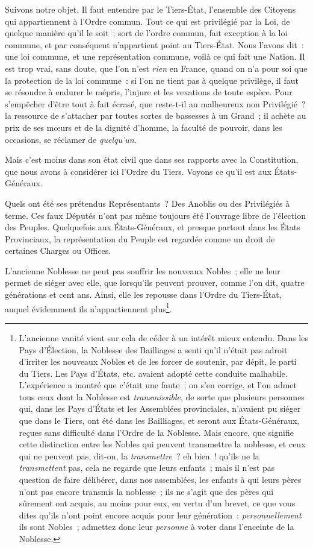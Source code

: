 \documentclass[french,twoside]{book} %
\begin{document}
Suivons notre objet. Il faut entendre par le Tiers-État, l’ensemble des Citoyens qui appartiennent à l’Ordre commun. Tout ce qui est privilégié par la Loi, de quelque manière qu’il le soit ; sort de l’ordre commun, fait exception à la loi commune, et par conséquent n’appartient point au Tiers-État. Nous l’avons dit : une loi commune, et une représentation commune, voilà ce qui fait une Nation. Il est trop vrai, sans doute, que l’on n’est {\itshape rien} en France, quand on n’a pour soi que la protection de la loi commune : si l’on ne tient pas à quelque privilège, il faut se résoudre à endurer le mépris, l’injure et les vexations de toute espèce. Pour s’empêcher d’être tout à fait écrasé, que reste-t-il au malheureux non Privilégié ? la ressource de s’attacher par toutes sortes de bassesses à un Grand ; il achète au prix de ses mœurs et de la dignité d’homme, la faculté de pouvoir, dans les occasions, se réclamer de {\itshape quelqu’un}.\par
Mais c’est moins dans son état civil que dans ses rapports avec la Constitution, que nous avons à considérer ici l’Ordre du Tiers. Voyons ce qu’il est aux États-Généraux.\par
Quels ont été ses prétendus Représentants ? Des Anoblis ou des Privilégiés à terme. Ces faux Députés n’ont pas même toujours été l’ouvrage libre de l’élection des Peuples. Quelquefois aux États-Généraux, et presque partout dans les États Provinciaux, la représentation du Peuple est regardée comme un droit de certaines Charges ou Offices.\par
L’ancienne Noblesse ne peut pas souffrir les nouveaux Nobles ; elle ne leur permet de siéger avec elle, que lorsqu’ils peuvent prouver, comme l’on dit, quatre générations et cent ans. Ainsi, elle les repousse dans l’Ordre du Tiers-État, auquel évidemment ils n’appartiennent plus\footnote{L’ancienne vanité vient sur cela de céder à un intérêt mieux entendu. Dans les Pays d’Élection, la Noblesse des Bailliages a senti qu’il n’était pas adroit d’irriter les nouveaux Nobles et de les forcer de soutenir, par dépit, le parti du Tiers. Les Pays d’États, etc. avaient adopté cette conduite malhabile. L’expérience a montré que c’était une faute ; on s’en corrige, et l’on admet tous ceux dont la Noblesse est {\itshape transmissible}, de sorte que plusieurs personnes qui, dans les Pays d’États et les Assemblées provinciales, n’avaient pu siéger que dans le Tiers, ont été dans les Bailliages, et seront aux États-Généraux, reçues sans difficulté dans l’Ordre de la Noblesse. Mais encore, que signifie cette distinction entre les Nobles qui peuvent transmettre la noblesse, et ceux qui ne peuvent pas, dit-on, la {\itshape transmettre} ? eh bien ! qu’ils ne la {\itshape transmettent} pas, cela ne regarde que leurs enfants ; mais il n’est pas question de faire délibérer, dans nos assemblées, les enfants à qui leurs pères n’ont pas encore transmis la noblesse ; ils ne s’agit que des pères qui sûrement ont acquis, au moins pour eux, en vertu d’un brevet, ce que vous dites qu’ils n’ont point encore acquis pour leur génération : {\itshape personnellement} ils sont Nobles ; admettez donc leur {\itshape personne} à voter dans l’enceinte de la Noblesse.}.\par
\end{document}
